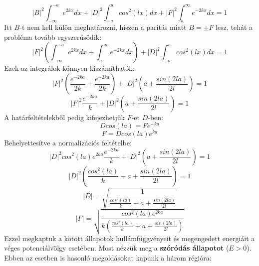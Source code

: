 \documentclass[a4paper,12pt]{article}
\begin{document}
\begin{equation}
    |B|^2 \int_{-\infty}^{-a} e^{2 k x} dx + |D|^2 \int_{-a}^{a} cos^2(l x) dx + |F|^2 \int_{a}^{\infty} e^{-2 k x} dx = 1
\end{equation}
Itt $B$-t nem kell külön meghatározni, hiszen a paritás miatt $B = \pm F$ lesz, tehát a probléma tovább egyszerűsödik:
\begin{equation}
    |F|^2 \left( \int_{-\infty}^{-a} e^{2 k x} dx + \int_{a}^{\infty} e^{-2 k x} dx \right) + |D|^2 \int_{-a}^{a} cos^2(l x) dx = 1
\end{equation}
Ezek az integrálok könnyen kiszámíthatók:
\begin{equation}
    |F|^2 \left( \frac{e^{-2 k a}}{2 k} + \frac{e^{-2 k a}}{2 k} \right) + |D|^2 \left( a + \frac{sin(2 l a)}{2 l} \right) = 1
\end{equation}
\begin{equation}
    |F|^2 \frac{e^{-2 k a}}{k} + |D|^2 \left( a + \frac{sin(2 l a)}{2 l} \right) = 1
\end{equation}
A határfeltételekből pedig kifejezhetjük $F$-et $D$-ben:
\begin{equation}
    D cos(l a) = F e^{- k a}
\end{equation}
\begin{equation}
    F = D cos(l a) e^{k a}
\end{equation}
Behelyettesítve a normalizációs feltételbe:
\begin{equation}
    |D|^2 cos^2(l a) e^{2 k a} \frac{e^{-2 k a}}{k} + |D|^2 \left( a + \frac{sin(2 l a)}{2 l} \right) = 1
\end{equation}
\begin{equation}
    |D|^2 \left( \frac{cos^2(l a)}{k} + a + \frac{sin(2 l a)}{2 l} \right) = 1
\end{equation}
\begin{equation}
    |D| = \sqrt{\frac{1}{\frac{cos^2(l a)}{k} + a + \frac{sin(2 l a)}{2 l}}}
\end{equation}
\begin{equation}
    |F| = \sqrt{\frac{cos^2(l a) e^{2 k a}}{k \left( \frac{cos^2(l a)}{k} + a + \frac{sin(2 l a)}{2 l} \right)}}
\end{equation}
Ezzel megkaptuk a kötött állapotok hullámfüggvényeit és megengedett energiáit a véges potenciálvölgy esetében.
\newline
\newline
Most nézzük meg a \textbf{szóródás állapotot} ($E > 0$). Ebben az esetben is hasonló megoldásokat kapunk a három régióra:
\end{document}
